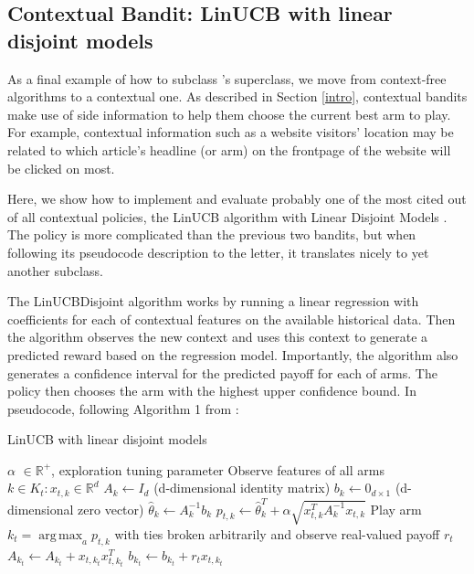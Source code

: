 \documentclass{jss}
\DeclareMathOperator*{\argmax}{arg\,max}
\begin{document}
\subsection{Contextual Bandit: LinUCB with linear disjoint models} \label{linucbc}

As a final example of how to subclass 's  superclass, we move from context-free algorithms to a contextual one. As described in Section \ref{intro}, contextual bandits make use of side information to help them choose the current best arm to play. For example, contextual information such as a website visitors' location may be related to which article's headline (or arm) on the frontpage of the website will be clicked on most.

Here, we show how to implement and evaluate probably one of the most cited out of all contextual policies, the LinUCB algorithm with Linear Disjoint Models \cite{Li2010}. The policy is more complicated than the previous two bandits, but when following its pseudocode description to the letter, it translates nicely to yet another  subclass.

The LinUCBDisjoint algorithm works by running a linear regression with coefficients for each of  contextual features on the available historical data. Then the algorithm observes the new context and uses this context to generate a predicted reward based on the regression model. Importantly, the algorithm also generates a confidence interval for the predicted payoff for each of  arms. The policy then chooses the arm with the highest upper confidence bound. In pseudocode, following Algorithm 1 from \cite{Li2010}:

\begin{algorithm}[H]
\caption{LinUCB with linear disjoint models}
\label{Alg:LinUCBDisjoint}
\begin{algorithmic}
\REQUIRE $\alpha$ \(  \in \mathbb{R}^{+} \), exploration tuning parameter
          \STATE Observe features of all arms \(  k \in K_{t}: x_{t,k} \in \mathbb{R}^{d}\)
		      \STATE \(A_{k} \leftarrow I_{d}  \)  (d-dimensional identity matrix)
		      \STATE \(b_{k} \leftarrow 0_{d\times1}   \) (d-dimensional zero vector)
		\ENDIF
		\STATE \( \hat{\theta}_{k} \leftarrow A_{k}^{-1}b_{k} \)
		\STATE \( p_{t,k} \leftarrow \hat{\theta}_{k}^{T} + \alpha  \sqrt{ x_{t,k}^{T} A_{k}^{-1}x_{t,k}} \)
	\ENDFOR
	\STATE Play arm \(k_t = \argmax_a  p_{t,k}  \) with ties broken arbitrarily and observe real-valued payoff $r_t$
           \STATE \( A_{k_{t}} \leftarrow A_{k_{t}}+ x_{t,k_{t}}x_{t,k_{t}}^{T} \)
           \STATE  \( b_{k_{t}} \leftarrow b_{k_{t}}+ r_{t}x_{t,k_{t}}  \)
\ENDFOR
\end{algorithmic}
\end{algorithm}
\end{document}
